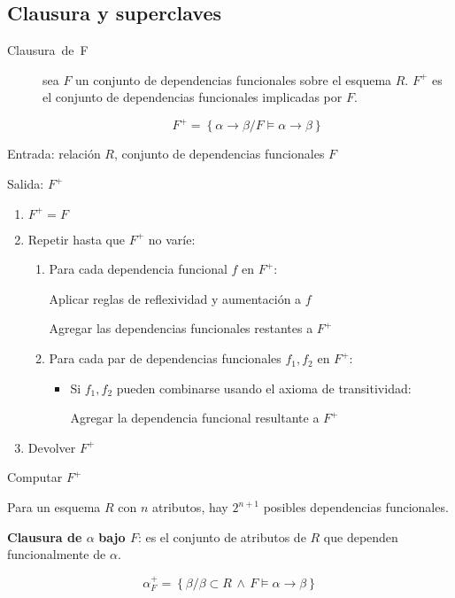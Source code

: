 \documentclass[a4paper, twoside]{article}
\begin{document}
\subsection{Clausura y superclaves}
\begin{description}
\item [{Clausura~de~F}] sea $F$ un conjunto de dependencias funcionales
sobre el esquema $R$. $F^{+}$ es el conjunto de dependencias funcionales
implicadas por $F$.


\[
F^{+}=\left\{ \alpha\to\beta/F\vDash\alpha\to\beta\right\} 
\]


\end{description}
\begin{algorithm}[H]
Entrada: relación $R$, conjunto de dependencias funcionales $F$

Salida: $F^{+}$
\begin{enumerate}
\item $F^{+}=F$
\item Repetir hasta que $F^{+}$ no varíe:

\begin{enumerate}
\item Para cada dependencia funcional $f$ en $F^{+}$:


Aplicar reglas de reflexividad y aumentación a $f$


Agregar las dependencias funcionales restantes a $F^{+}$

\item Para cada par de dependencias funcionales $f_{1},f_{2}$ en $F^{+}$:

\begin{itemize}
\item Si $f_{1},f_{2}$ pueden combinarse usando el axioma de transitividad:


Agregar la dependencia funcional resultante a $F^{+}$

\end{itemize}
\end{enumerate}
\item Devolver $F^{+}$
\end{enumerate}
\protect\caption{Computar $F^{+}$}
\end{algorithm}


Para un esquema $R$ con $n$ atributos, hay $2^{n+1}$ posibles dependencias
funcionales.

\textbf{Clausura de $\alpha$} \textbf{bajo $F$}: es el conjunto
de atributos de $R$ que dependen funcionalmente de $\alpha$.

\[
\alpha_{F}^{+}=\left\{ \beta/\beta\subset R\,\wedge\, F\vDash\alpha\to\beta\right\} 
\]
\end{document}
